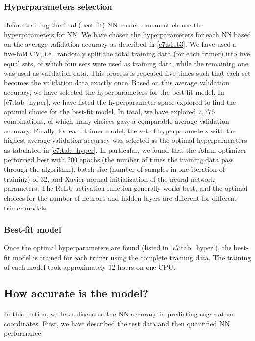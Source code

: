 \subsubsection{Hyperparameters selection}
Before training the final (best-fit) NN model, one must choose the hyperparameters for NN. 
We have chosen the hyperparameters for each NN based on the average validation accuracy as described in \cref{c7:s1sb3}.
We have used a five-fold CV, i.e., randomly split the total training data (for each trimer) into five equal sets, of which four sets were used as training data, while the remaining one was used as validation data.
This process is repeated five times such that each set becomes the validation data exactly once.
Based on this average validation accuracy, we have selected the hyperparameters for the best-fit model.
In \cref{c7:tab_hyper}, we have listed the hyperparameter space explored to find the optimal choice for the best-fit model.
In total, we have explored $7,776$ combinations, of which many choices gave a comparable average validation accuracy.
Finally, for each trimer model, the set of hyperparameters with the highest average validation accuracy was selected as the optimal hyperparameters as tabulated in \cref{c7:tab_hyper}.
In particular, we found that the Adam optimizer performed best with 200 epochs (the number of times the training data pass through the algorithm), batch-size (number of samples in one iteration of training) of 32, and Xavier normal initialization of the neural network parameters.
The ReLU activation function generally works best, and the optimal choices for the number of neurons and hidden layers are different for different trimer models. 

\subsubsection{Best-fit model} 
Once the optimal hyperparameters are found (listed in \cref{c7:tab_hyper}), the best-fit model is trained for each trimer using the complete training data.
The training of each model took approximately 12 hours on one CPU. 


\subsection{How accurate is the model?}
In this section, we have discussed the NN accuracy in predicting sugar atom coordinates. 
First, we have described the test data and then quantified NN performance.


